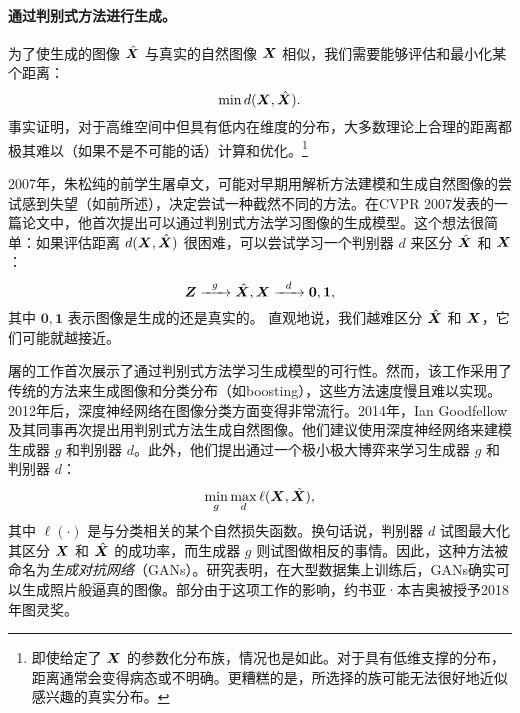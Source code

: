 \documentclass[../../book-main_zh.tex]{subfiles}
\begin{document}
\paragraph{通过判别式方法进行生成。}
为了使生成的图像 $\hat {\bm{X}}$ 与真实的自然图像 $\bm{X}$ 相似，我们需要能够评估和最小化某个距离：
\begin{equation}
    \min d(\bm{X}, \hat {\bm{X}}).
\end{equation}
事实证明，对于高维空间中但具有低内在维度的分布，大多数理论上合理的距离都极其难以（如果不是不可能的话）计算和优化。\footnote{即使给定了 $\bm{X}$ 的参数化分布族，情况也是如此。对于具有低维支撑的分布，距离通常会变得病态或不明确。更糟糕的是，所选择的族可能无法很好地近似感兴趣的真实分布。}

2007年，朱松纯的前学生屠卓文，可能对早期用解析方法建模和生成自然图像的尝试感到失望（如前所述），决定尝试一种截然不同的方法。在CVPR 2007发表的一篇论文中\cite{Tu-2007}，他首次提出可以通过判别式方法学习图像的生成模型。这个想法很简单：如果评估距离 $d(\bm{X}, \hat {\bm{X}})$ 很困难，可以尝试学习一个判别器 $d$ 来区分 $\hat {\bm{X}}$ 和 $\bm{X}$：
\begin{equation}
    \bm{Z}   \xrightarrow{\hspace{2mm} g  \hspace{2mm}} \hat {\bm{X}}, \bm{X} \xrightarrow{\hspace{2mm} d  \hspace{2mm}} \boldsymbol{0}, \boldsymbol{1},
       \label{eqn:gan-networks}
\end{equation}
其中 $\boldsymbol{0}, \boldsymbol{1}$ 表示图像是生成的还是真实的。
直观地说，我们越难区分 $\hat {\bm{X}}$ 和 $\bm{X}$，它们可能就越接近。

屠的工作\cite{Tu-2007}首次展示了通过判别式方法学习生成模型的可行性。然而，该工作采用了传统的方法来生成图像和分类分布（如boosting），这些方法速度慢且难以实现。2012年后，深度神经网络在图像分类方面变得非常流行。2014年，Ian Goodfellow及其同事再次提出用判别式方法生成自然图像\cite{Goodfellow-2014}。他们建议使用深度神经网络来建模生成器 $g$ 和判别器 $d$。此外，他们提出通过一个极小极大博弈来学习生成器 $g$ 和判别器 $d$：
\begin{equation}
    \min_g \max_d \ell(\bm{X}, \hat {\bm{X}}),
\end{equation}
其中 $\ell(\cdot)$ 是与分类相关的某个自然损失函数。换句话说，判别器 $d$ 试图最大化其区分 $\bm{X}$ 和 $\hat {\bm{X}}$ 的成功率，而生成器 $g$ 则试图做相反的事情。因此，这种方法被命名为{\em 生成对抗网络}（GANs）。研究表明，在大型数据集上训练后，GANs确实可以生成照片般逼真的图像。部分由于这项工作的影响，约书亚·本吉奥被授予2018年图灵奖。
\end{document}
